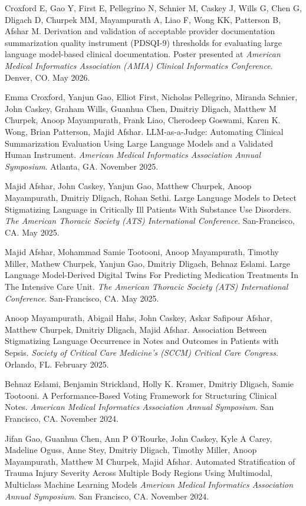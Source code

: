 \documentclass[letterpaper]{article}
\renewenvironment{itemize}{
  \begin{list}{}{
    \setlength{\leftmargin}{1.5em}
  }
}{
  \end{list}
}
\begin{document}
\begin{itemize}
\item Croxford E, Gao Y, First E, Pellegrino N, Schnier M, Caskey J, Wills G, Chen G, Dligach D, Churpek MM, Mayampurath A, Liao F, Wong KK, Patterson B, Afshar M. Derivation and validation of acceptable provider documentation summarization quality instrument (PDSQI-9) thresholds for evaluating large language model-based clinical documentation. Poster presented at \emph{American Medical Informatics Association (AMIA) Clinical Informatics Conference}. Denver, CO. May 2026.
\item Emma Croxford, Yanjun Gao, Elliot First, Nicholas Pellegrino, Miranda Schnier, John Caskey, Graham Wills, Guanhua Chen, Dmitriy Dligach, Matthew M Churpek, Anoop Mayampurath, Frank Liao, Cherodeep Goswami, Karen K. Wong, Brian Patterson, Majid Afshar. LLM-as-a-Judge: Automating Clinical Summarization Evaluation Using Large Language Models and a Validated Human Instrument. \emph{American Medical Informatics Association Annual Symposium}. Atlanta, GA. November 2025.
\item Majid Afshar, John Caskey, Yanjun Gao, Matthew Churpek, Anoop Mayampurath, Dmitriy Dligach, Rohan Sethi. Large Language Models to Detect Stigmatizing Language in Critically Ill Patients With Substance Use Disorders. \emph{The American Thoracic Society (ATS) International Conference}. San-Francisco, CA. May 2025.
\item Majid Afshar, Mohammad Samie Tootooni, Anoop Mayampurath, Timothy Miller, Mathew Churpek, Yanjun Gao, Dmitriy Dligach, Behnaz Eslami. Large Language Model-Derived Digital Twins For Predicting Medication Treatments In The Intensive Care Unit. \emph{The American Thoracic Society (ATS) International Conference}. San-Francisco, CA. May 2025.
\item Anoop Mayampurath, Abigail Hahs, John Caskey, Askar Safipour Afshar, Matthew Churpek, Dmitriy Dligach, Majid Afshar. Association Between Stigmatizing Language Occurrence in Notes and Outcomes in Patients with Sepsis. \emph{Society of Critical Care Medicine's (SCCM) Critical Care Congress}. Orlando, FL. February 2025.
\item Behnaz Eslami, Benjamin Strickland, Holly K. Kramer, Dmitriy Dligach, Samie Tootooni. A Performance-Based Voting Framework for Structuring Clinical Notes. \emph{American Medical Informatics Association Annual Symposium}. San Francisco, CA. November 2024.
\item Jifan Gao, Guanhua Chen, Ann P O’Rourke, John Caskey, Kyle A Carey, Madeline Oguss, Anne Stey, Dmitriy Dligach, Timothy Miller, Anoop Mayampurath, Matthew M Churpek, Majid Afshar. Automated Stratification of Trauma Injury Severity Across Multiple Body Regions Using Multimodal, Multiclass Machine Learning Models \emph{American Medical Informatics Association Annual Symposium}. San Francisco, CA. November 2024.

\end{itemize}
\end{document}
